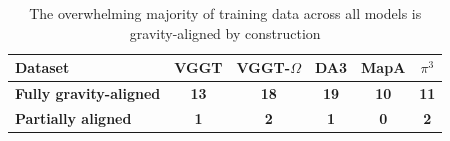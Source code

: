 \begin{table}[t]
\centering
\caption{The overwhelming majority of training data across all models is gravity-aligned by construction}
\label{tab:summary_training_data}
\small
\begin{tabular}{@{}llccccc@{}}
\toprule
\multicolumn{2}{l}{\textbf{Dataset}}               & \textbf{VGGT} & \textbf{VGGT-$\Omega$} & \textbf{DA3} & \textbf{MapA} & \textbf{$\pi^3$} \\ \midrule
\multicolumn{2}{l}{\textbf{Fully gravity-aligned}} & \textbf{13}   & \textbf{18}            & \textbf{19}  & \textbf{10}   & \textbf{11}      \\
\multicolumn{2}{l}{\textbf{Partially aligned}}     & \textbf{1}    & \textbf{2}             & \textbf{1}   & \textbf{0}    & \textbf{2}       \\ \bottomrule
\end{tabular}
\end{table}
